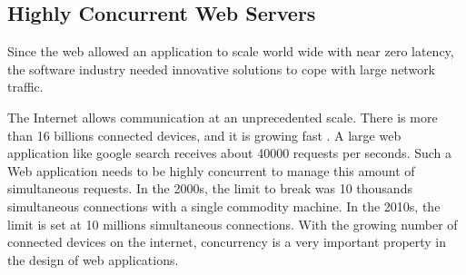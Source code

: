 

\subsection{Highly Concurrent Web Servers}


Since the web allowed an application to scale world wide with near zero latency, the software industry needed innovative solutions to cope with large network traffic.



The Internet allows communication at an unprecedented scale.
There is more than 16 billions connected devices, and it is growing fast \cite{Hilbert2011}.
A large web application like google search receives about \num{40000} requests per seconds.
Such a Web application needs to be highly concurrent to manage this amount of simultaneous requests.
In the 2000s, the limit to break was 10 thousands simultaneous connections with a single commodity machine.
In the 2010s, the limit is set at 10 millions simultaneous connections.
With the growing number of connected devices on the internet, concurrency is a very important property in the design of web applications.

